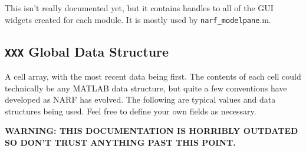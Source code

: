 \documentclass[letterpaper]{report}
\newcommand{\matlab}[1]{\texttt{#1}}
\begin{document}
This isn't really documented yet, but it contains handles to all of the GUI widgets created for each module. It is mostly used by \matlab{narf\_modelpane}.m.

\subsection{\matlab{XXX} Global Data Structure}

  A cell array, with the most recent data being first. The contents of each cell could technically be any MATLAB data structure, but quite a few conventions have developed as NARF has evolved. The following are typical values and data structures being used. Feel free to define your own fields as necessary.
 
  \textbf{WARNING: THIS DOCUMENTATION IS HORRIBLY OUTDATED SO DON'T TRUST ANYTHING PAST THIS POINT.}
\end{document}
